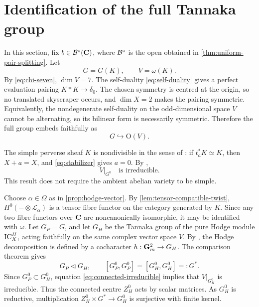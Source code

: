 \section{Identification of the full Tannaka group}

In this section, fix $b\in\mathcal B^\circ(\mathbf C)$, where $\mathcal B^\circ$ is the open
obtained in \cref{thm:uniform-pair-splitting}.
Let
\[
 G=G(K),\qquad V=\omega(K).
\]
By \eqref{eq:chi-seven}, $\dim V=7$.  The self-duality
\eqref{eq:self-duality} gives a perfect evaluation pairing
$K*K\to\delta_0$.  The chosen symmetry
is centred at the origin, so no translated skyscraper occurs, and
$\dim X=2$ makes the pairing symmetric.  Equivalently, the nondegenerate
self-duality on the odd-dimensional space $V$ cannot be alternating, so its
bilinear form is necessarily symmetric.  Therefore the full group embeds
faithfully as
\begin{equation}
 G\hookrightarrow \mathrm{O}(V).
\label{eq:orthogonal}
\end{equation}

The simple perverse sheaf $K$ is nondivisible in the sense of
\cite[Section~3.3]{JKLM2025}: if $t_a^*K\simeq K$, then $X+a=X$, and
\eqref{eq:stabilizer} gives $a=0$.  By
\cite[Proposition~3.3(2)]{JKLM2025},
\begin{equation}
 V|_{G^0}\quad\text{is irreducible}.
\label{eq:connected-irreducible}
\end{equation}
This result does not require the ambient abelian variety to be simple.

Choose $\alpha\in\Omega$ as in \cref{prop:hodge-vector}.  By
\cref{lem:tensor-compatible-twist}, $H^0(-\otimes\mathcal L_\alpha)$ is a
tensor fibre functor on the category generated by $K$.  Since any two fibre
functors over $\mathbf C$ are noncanonically isomorphic, it may be identified
with $\omega$.  Let $G_P=G$, and let
$G_H$ be the Tannaka group of the pure Hodge module $\operatorname{IC}_X^H$, acting
faithfully on the same complex vector space $V$.
By \cite[Corollary~3.2]{KLM2026}, the Hodge decomposition is defined by a
cocharacter $h:\mathbf G_m^2\to G_H$.  The comparison theorem
\cite[Corollary~2.5]{KLM2026} gives
\[
 G_P\mathrel{\triangleleft}G_H,
 \qquad
 [G_P^0,G_P^0]=[G_H^0,G_H^0]=:G^*.
\]
Since $G_P^0\subset G_H^0$, equation
\eqref{eq:connected-irreducible} implies that $V|_{G_H^0}$ is irreducible.
Thus the connected centre $Z_H^0$ acts by scalar matrices.  As $G_H^0$ is
reductive, multiplication $Z_H^0\times G^*\to G_H^0$ is surjective with
finite kernel.


